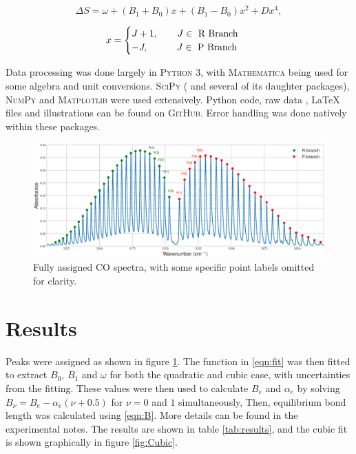 \documentclass[aps,prl,reprint,10pt,amsmath,amssymb,superscriptaddress,a4paper]{revtex4-2}
\begin{document}
\begin{equation}
\label{eqn:fit}
\Delta S = \omega + \left( B_1 + B_0 \right) x + \left( B_1 - B_0 \right) x^2 + D x^4,
\end{equation}

\[ x = 
\begin{cases}
J + 1, \qquad J \in \textnormal{ R Branch }  \\
-J,    \qquad  \quad J \in \textnormal{ P Branch}
\end{cases}
\]

Data processing was done largely in \textsc{Python 3}, with \textsc{Mathematica} being used for some algebra and unit conversions. \textsc{SciPy} ( and several of its daughter packages), \textsc{NumPy} and \textsc{Matplotlib} were used extensively. Python code, raw data , {\LaTeX} files and illustrations can be found on \textsc{GitHub}\cite{GitHub}. Error handling was done natively within these packages.

\begin{figure}[t]
\centering
\includegraphics[width = 16 cm]{FormalExport.eps}
\caption{Fully assigned CO spectra, with some specific point labels omitted for clarity.}
\label{fig:spectra}
\end{figure}

\section{Results}

Peaks were assigned as shown in figure \ref{fig:spectra}. The function in \ref{eqn:fit} was then fitted to extract $B_0$, $B_1$ and $\omega$ for both the quadratic and cubic case, with uncertainties from the fitting. These values were then used to calculate $B_e$ and $\alpha_e$ by solving $B_\nu = B_e - \alpha_e \left( \nu + 0.5 \right)$ for $\nu = 0$ and $1$ simultaneously, Then, equilibrium bond length was calculated using \ref{eqn:B}. More details can be found in the experimental notes\cite{notes}. The results are shown in table \ref{tab:results}, and the cubic fit is shown graphically in figure \ref{fig:Cubic}.
\end{document}
